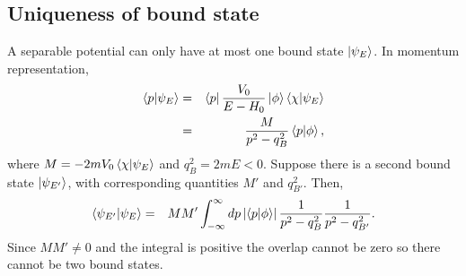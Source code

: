 \subsection{Uniqueness of bound state}
\label{app3}
%
A separable potential  can only have at most one bound state $\ket{\psi_{E}}$.
In momentum representation,
%
\begin{eqnarray}
\braket{p}{\psi_{E}}&=&\bra{p}\frac{V_{0}}{E-H_{0}}\ket{\phi}\braket{\chi}{\psi_{E}}
\nonumber \\
&=&\frac{M}{p^{2}-q_{B}^{2}}\braket{p}{\phi},
\end{eqnarray}
%
where $M=-2 m V_{0} \braket{\chi}{\psi_{E}}$ and $q_{B}^2=2 m E<0$. Suppose there is a second bound state $\ket{\psi_{E'}}$,
with corresponding quantities $M'$ and $q_{B'}^2$. Then,
%
\begin{eqnarray}
\braket{\psi_{E'}}{\psi_{E}}&=&M M' \int_{-\infty}^\infty dp \left|\braket{p}{\phi}\right| \frac{1}{p^{2}-q_{B}^{2}}\frac{1}{p^{2}-q_{B'}^{2}}. \nonumber \\		\end{eqnarray}
%
Since $MM'\ne 0$ and the integral is positive the overlap cannot be zero
so there cannot be two bound states.
